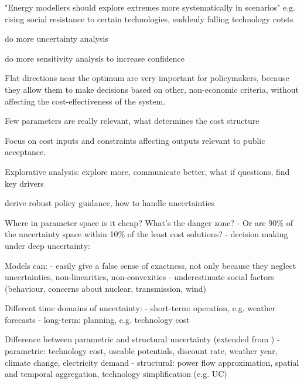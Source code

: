 

"Energy modellers should explore extremes more systematically in scenarios" e.g. rising social resistance to certain technologies, suddenly falling technology cotsts \cite{mccollum_energy_2020,pye_modelling_2020}

do more uncertainty analysis \cite{yue_review_2018, pye_assessing_2018, Pfenninger2014,pye_modelling_2020,decarolis_leveraging_nodate} 

do more sensitivity analysis to increase confidence \cite{bistline_deepening_2020} 

Flat directions near the optimum are very important for policymakers,
because they allow them to make decisions based on other,
non-economic criteria, without affecting the cost-effectiveness of the system.

Few parameters are really relevant, what determines the cost structure \cite{moret_characterization_2017} \cite{usher_value_2015}

Focus on cost inputs and constraints affecting outputs relevant to public acceptance.

Explorative analysis: explore more, communicate better, what if questions, find key drivers

derive robust policy guidance, how to handle uncertainties 

Where in parameter space is it cheap? What's the danger zone?
- Or are 90\% of the uncertainty space within 10\% of the least cost solutions?
- decision making under deep uncertainty:

Models can:
- easily give a false sense of exactness, not only because they neglect uncertainties, non-linearities, non-convexities
- underestimate social factors (behaviour, concerns about nuclear, transmission, wind)


Different time domains of uncertainty:
- short-term: operation, e.g. weather forecasts
- long-term: planning, e.g. technology cost

Difference between parametric and structural uncertainty (extended from \cite{DeCarolis2017})
- parametric: technology cost, useable potentials, discount rate, weather year, climate change, electricity demand
- structural: power flow approximation, spatial and temporal aggregation, technology simplification (e.g. UC)


